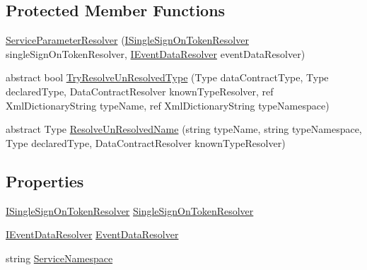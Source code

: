 \subsection*{Protected Member Functions}
\begin{DoxyCompactItemize}
\item 
\hyperlink{classCqrs_1_1Services_1_1ServiceParameterResolver_a635623bf86cf7b365a1b748dcc02daa8}{Service\+Parameter\+Resolver} (\hyperlink{interfaceCqrs_1_1Services_1_1ISingleSignOnTokenResolver}{I\+Single\+Sign\+On\+Token\+Resolver} single\+Sign\+On\+Token\+Resolver, \hyperlink{interfaceCqrs_1_1Services_1_1IEventDataResolver}{I\+Event\+Data\+Resolver} event\+Data\+Resolver)
\item 
abstract bool \hyperlink{classCqrs_1_1Services_1_1ServiceParameterResolver_a943e9bb30a085ba6783f6f8a2aa73315}{Try\+Resolve\+Un\+Resolved\+Type} (Type data\+Contract\+Type, Type declared\+Type, Data\+Contract\+Resolver known\+Type\+Resolver, ref Xml\+Dictionary\+String type\+Name, ref Xml\+Dictionary\+String type\+Namespace)
\item 
abstract Type \hyperlink{classCqrs_1_1Services_1_1ServiceParameterResolver_abc39516ffe5d8fca43502e7902791ff8}{Resolve\+Un\+Resolved\+Name} (string type\+Name, string type\+Namespace, Type declared\+Type, Data\+Contract\+Resolver known\+Type\+Resolver)
\end{DoxyCompactItemize}
\subsection*{Properties}
\begin{DoxyCompactItemize}
\item 
\hyperlink{interfaceCqrs_1_1Services_1_1ISingleSignOnTokenResolver}{I\+Single\+Sign\+On\+Token\+Resolver} \hyperlink{classCqrs_1_1Services_1_1ServiceParameterResolver_a08650fb09869509a27501652649738f4}{Single\+Sign\+On\+Token\+Resolver}
\item 
\hyperlink{interfaceCqrs_1_1Services_1_1IEventDataResolver}{I\+Event\+Data\+Resolver} \hyperlink{classCqrs_1_1Services_1_1ServiceParameterResolver_a015f7092810d25cfb1ca266b6bc55c28}{Event\+Data\+Resolver}
\item 
string \hyperlink{classCqrs_1_1Services_1_1ServiceParameterResolver_a37238c90755acb0d00951a234e26445c}{Service\+Namespace}
\end{DoxyCompactItemize}


